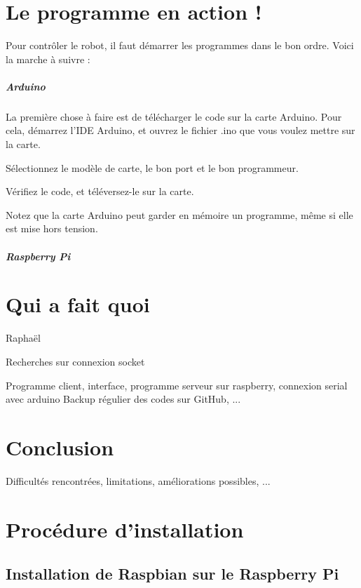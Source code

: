 \documentclass[12pt,a4paper]{report}
\begin{document}
\chapter{Le programme en action !}

Pour contrôler le robot, il faut démarrer les programmes dans le bon ordre. Voici la marche à suivre :

\paragraph{Arduino} La première chose à faire est de télécharger le code sur la carte Arduino. Pour cela, démarrez l'IDE Arduino, et ouvrez le fichier .ino que vous voulez mettre sur la carte.

Sélectionnez le modèle de carte, le bon port et le bon programmeur.

Vérifiez le code, et téléversez-le sur la carte.

Notez que la carte Arduino peut garder en mémoire un programme, même si elle est mise hors tension.

\paragraph{Raspberry Pi} %

\chapter{Qui a fait quoi}

Raphaël

Recherches sur connexion socket

Programme client, interface, programme serveur sur raspberry, connexion serial avec arduino
Backup régulier des codes sur GitHub, ...

\chapter{Conclusion}

Difficultés rencontrées, limitations, améliorations possibles, ...

\appendix

\chapter{Procédure d'installation}

\section{Installation de Raspbian sur le Raspberry Pi}
\end{document}
